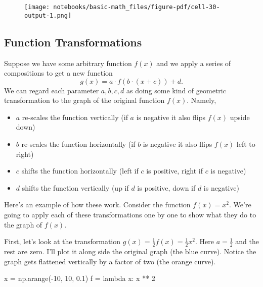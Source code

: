 \documentclass[
  letterpaper,
  DIV=11,
  numbers=noendperiod]{scrreprt}
\newenvironment{Shaded}{\begin{snugshade}}{\end{snugshade}}
\newcommand{\DecValTok}[1]{\textcolor[rgb]{0.68,0.00,0.00}{#1}}
\newcommand{\FloatTok}[1]{\textcolor[rgb]{0.68,0.00,0.00}{#1}}
\newcommand{\KeywordTok}[1]{\textcolor[rgb]{0.00,0.23,0.31}{#1}}
\newcommand{\NormalTok}[1]{\textcolor[rgb]{0.00,0.23,0.31}{#1}}
\newcommand{\OperatorTok}[1]{\textcolor[rgb]{0.37,0.37,0.37}{#1}}
\providecommand{\tightlist}{%
  \setlength{\itemsep}{0pt}\setlength{\parskip}{0pt}}\usepackage{longtable,booktabs,array}
\begin{document}
\begin{figure}[H]

{\centering \texttt{[image: notebooks/basic-math\_files/figure-pdf/cell-30-output-1.png]}

}

\end{figure}

\hypertarget{function-transformations}{%
\subsection{Function Transformations}\label{function-transformations}}

Suppose we have some arbitrary function \(f(x)\) and we apply a series
of compositions to get a new function
\[g(x)=a \cdot f(b \cdot (x + c)) + d.\] We can regard each parameter
\(a,b,c,d\) as doing some kind of geometric transformation to the graph
of the original function \(f(x)\). Namely,

\begin{itemize}
\tightlist
\item
  \(a\) re-scales the function vertically (if \(a\) is negative it also
  flips \(f(x)\) upside down)
\item
  \(b\) re-scales the function horizontally (if \(b\) is negative it
  also flips \(f(x)\) left to right)
\item
  \(c\) shifts the function horizontally (left if \(c\) is positive,
  right if \(c\) is negative)
\item
  \(d\) shifts the function vertically (up if \(d\) is positive, down if
  \(d\) is negative)
\end{itemize}

Here's an example of how these work. Consider the function \(f(x)=x^2\).
We're going to apply each of these transformations one by one to show
what they do to the graph of \(f(x)\).

First, let's look at the transformation
\(g(x) = \frac{1}{2} f(x) = \frac{1}{2} x^2\). Here \(a=\frac{1}{2}\)
and the rest are zero. I'll plot it along side the original graph (the
blue curve). Notice the graph gets flattened vertically by a factor of
two (the orange curve).

\begin{Shaded}
\begin{Highlighting}[]
\NormalTok{x }\OperatorTok{=}\NormalTok{ np.arange(}\OperatorTok{{-}}\DecValTok{10}\NormalTok{, }\DecValTok{10}\NormalTok{, }\FloatTok{0.1}\NormalTok{)}
\NormalTok{f }\OperatorTok{=} \KeywordTok{lambda}\NormalTok{ x: x }\OperatorTok{**} \DecValTok{2}
\end{Highlighting}
\end{Shaded}
\end{document}
